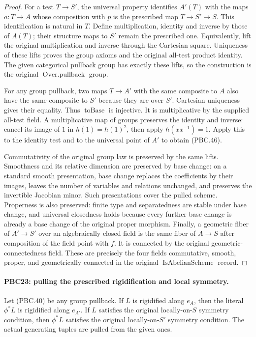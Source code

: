 \documentclass[11pt,a4paper]{article}
\numberwithin{equation}{section}
\theoremstyle{remark}\newtheorem{remark}[theorem]{Remark}
\begin{document}
\begin{proof}
For a test $T\to S'$, the universal property identifies
$A'(T)$ with the maps $a:T\to A$ whose composition with
$p$ is the prescribed map $T\to S'\to S$.
This identification is natural in $T$.  Define multiplication,
identity and inverse by those of $A(T)$; their structure
maps to $S'$ remain the prescribed one.
Equivalently, lift the original multiplication and inverse
through the Cartesian square.  Uniqueness of these lifts
proves the group axioms and the original all-test product
identity.  The given categorical pullback group has exactly
these lifts, so the construction is the original
$\operatorname{Over.pullback}$ group.

For any group pullback, two maps $T\to A'$ with the same
composite to $A$ also have the same composite to $S'$
because they are over $S'$.  Cartesian uniqueness gives
their equality.  Thus $\operatorname{toBase}$ is injective.
It is multiplicative by the supplied all-test field.
A multiplicative map of groups preserves the identity
and inverse: cancel its image of $1$ in
$h(1)=h(1)^2$, then apply $h(xx^{-1})=1$.
Apply this to the identity test and to the universal point
of $A'$ to obtain (PBC.46).

Commutativity of the original group law is preserved by
the same lifts.  Smoothness and its relative dimension
are preserved by base change: on a standard smooth
presentation, base change replaces the coefficients by
their images, leaves the number of variables and relations
unchanged, and preserves the invertible Jacobian minor.
Such presentations cover the pulled scheme.
Properness is also preserved: finite type and separatedness
are stable under base change, and universal closedness
holds because every further base change is already a base
change of the original proper morphism.
Finally, a geometric fiber of $A'\to S'$ over an
algebraically closed field is the same fiber of $A\to S$
after composition of the field point with $f$.
It is connected by the original geometric-connectedness
field.  These are precisely the four fields
commutative, smooth, proper, and geometrically connected
in the original $\operatorname{IsAbelianScheme}$ record.
\end{proof}

\paragraph{PBC23: pulling the prescribed rigidification and local symmetry.}
\label{claim:PBC23}
Let (PBC.40) be any group pullback.
If $L$ is rigidified along $e_A$, then the literal $\phi^*L$
is rigidified along $e_{A'}$.
If $L$ satisfies the original locally-on-$S$ symmetry
condition, then $\phi^*L$ satisfies the original
locally-on-$S'$ symmetry condition.
The actual generating tuples are pulled from the given ones.
\end{document}
